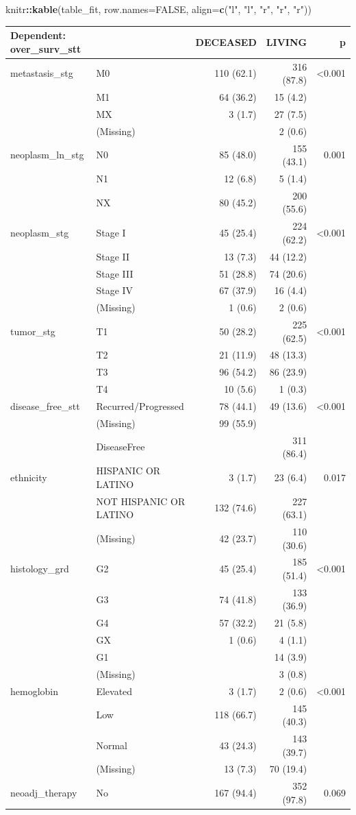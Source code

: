 \documentclass[]{article}
\newenvironment{Shaded}{\begin{snugshade}}{\end{snugshade}}
\newcommand{\KeywordTok}[1]{\textcolor[rgb]{0.13,0.29,0.53}{\textbf{#1}}}
\newcommand{\DataTypeTok}[1]{\textcolor[rgb]{0.13,0.29,0.53}{#1}}
\newcommand{\StringTok}[1]{\textcolor[rgb]{0.31,0.60,0.02}{#1}}
\newcommand{\OtherTok}[1]{\textcolor[rgb]{0.56,0.35,0.01}{#1}}
\newcommand{\OperatorTok}[1]{\textcolor[rgb]{0.81,0.36,0.00}{\textbf{#1}}}
\newcommand{\NormalTok}[1]{#1}
\begin{document}
\begin{Shaded}
\begin{Highlighting}[]
\NormalTok{knitr}\OperatorTok{::}\KeywordTok{kable}\NormalTok{(table_fit, }\DataTypeTok{row.names=}\OtherTok{FALSE}\NormalTok{, }\DataTypeTok{align=}\KeywordTok{c}\NormalTok{(}\StringTok{"l"}\NormalTok{, }\StringTok{"l"}\NormalTok{, }\StringTok{"r"}\NormalTok{, }\StringTok{"r"}\NormalTok{, }\StringTok{"r"}\NormalTok{))}
\end{Highlighting}
\end{Shaded}

\begin{longtable}[]{@{}llrrr@{}}
\toprule
Dependent: over\_surv\_stt & & DECEASED & LIVING & p\tabularnewline
\midrule
\endhead
metastasis\_stg & M0 & 110 (62.1) & 316 (87.8) &
\textless{}0.001\tabularnewline
& M1 & 64 (36.2) & 15 (4.2) &\tabularnewline
& MX & 3 (1.7) & 27 (7.5) &\tabularnewline
& (Missing) & & 2 (0.6) &\tabularnewline
neoplasm\_ln\_stg & N0 & 85 (48.0) & 155 (43.1) & 0.001\tabularnewline
& N1 & 12 (6.8) & 5 (1.4) &\tabularnewline
& NX & 80 (45.2) & 200 (55.6) &\tabularnewline
neoplasm\_stg & Stage I & 45 (25.4) & 224 (62.2) &
\textless{}0.001\tabularnewline
& Stage II & 13 (7.3) & 44 (12.2) &\tabularnewline
& Stage III & 51 (28.8) & 74 (20.6) &\tabularnewline
& Stage IV & 67 (37.9) & 16 (4.4) &\tabularnewline
& (Missing) & 1 (0.6) & 2 (0.6) &\tabularnewline
tumor\_stg & T1 & 50 (28.2) & 225 (62.5) &
\textless{}0.001\tabularnewline
& T2 & 21 (11.9) & 48 (13.3) &\tabularnewline
& T3 & 96 (54.2) & 86 (23.9) &\tabularnewline
& T4 & 10 (5.6) & 1 (0.3) &\tabularnewline
disease\_free\_stt & Recurred/Progressed & 78 (44.1) & 49 (13.6) &
\textless{}0.001\tabularnewline
& (Missing) & 99 (55.9) & &\tabularnewline
& DiseaseFree & & 311 (86.4) &\tabularnewline
ethnicity & HISPANIC OR LATINO & 3 (1.7) & 23 (6.4) &
0.017\tabularnewline
& NOT HISPANIC OR LATINO & 132 (74.6) & 227 (63.1) &\tabularnewline
& (Missing) & 42 (23.7) & 110 (30.6) &\tabularnewline
histology\_grd & G2 & 45 (25.4) & 185 (51.4) &
\textless{}0.001\tabularnewline
& G3 & 74 (41.8) & 133 (36.9) &\tabularnewline
& G4 & 57 (32.2) & 21 (5.8) &\tabularnewline
& GX & 1 (0.6) & 4 (1.1) &\tabularnewline
& G1 & & 14 (3.9) &\tabularnewline
& (Missing) & & 3 (0.8) &\tabularnewline
hemoglobin & Elevated & 3 (1.7) & 2 (0.6) &
\textless{}0.001\tabularnewline
& Low & 118 (66.7) & 145 (40.3) &\tabularnewline
& Normal & 43 (24.3) & 143 (39.7) &\tabularnewline
& (Missing) & 13 (7.3) & 70 (19.4) &\tabularnewline
neoadj\_therapy & No & 167 (94.4) & 352 (97.8) & 0.069\tabularnewline

\end{longtable}
\end{document}

